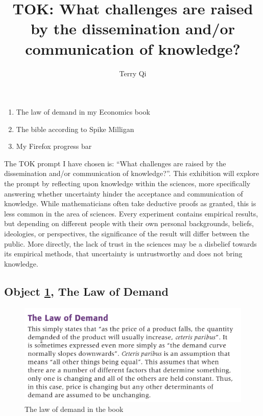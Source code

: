 \documentclass[a4paper,12pt]{article}
\title{TOK: What challenges are raised by the dissemination and/or communication of knowledge?}
\author{Terry Qi}
\begin{document}
\maketitle
\begin{enumerate}
 \item The law of demand in my Economics book
 \item The bible according to Spike Milligan
 \item My Firefox progress bar
\end{enumerate}

\newpage



The TOK prompt I have chosen is: ``What challenges are raised by the dissemination and/or communication of knowledge?''. This exhibition will explore the prompt by reflecting upon knowledge within the sciences, more specifically answering whether uncertainty hinder the acceptance and communication of knowledge. While mathematicians often take deductive proofs as granted, this is less common in the area of sciences. Every experiment contains empirical results, but depending on different people with their own personal backgrounds, beliefs, ideologies, or perspectives, the significance of the result will differ between the public. More directly, the lack of trust in the sciences may be a disbelief towards its empirical methods, that uncertainty is untrustworthy and does not bring knowledge.


\subsection*{Object \ref{fig:lod}, The Law of Demand}

\begin{figure}[h!]
 \centering
 \includegraphics[scale=0.25]{ecobook.png}
 \caption{The law of demand in the book}
 \label{fig:lod}
\end{figure}
\end{document}
